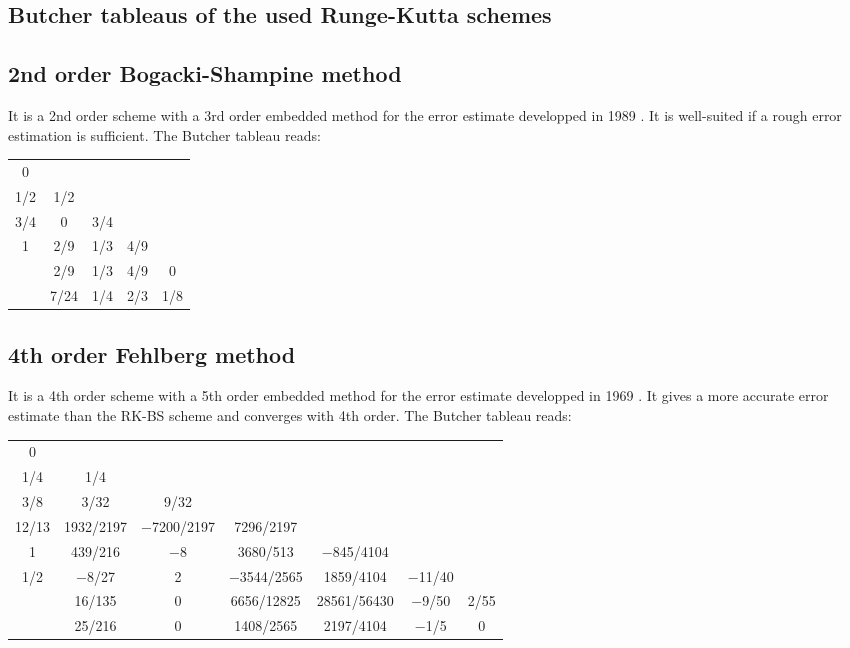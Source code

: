 \documentclass{report}
\begin{document}
\begin{appendices}
	
	\chapter{Butcher tableaus of the used Runge-Kutta schemes}
	\label{apx:ButcherTableaus}
	
	\section{2nd order Bogacki-Shampine method}
	It is a 2nd order scheme with a 3rd order embedded method for the error estimate developped in 1989 \cite{RK-BogackiShampine}. It is well-suited if a rough error estimation is sufficient. The Butcher tableau reads:
	\begin{center}
		\begin{tabular}{c | c c c c}
			0 & & & & \\
			1/2 & 1/2 & & & \\
			3/4 & 0 & 3/4 & & \\
			1 & 2/9 & 1/3 & 4/9 & \\ \hline
			& 2/9 & 1/3 & 4/9 & 0 \\
			& 7/24 & 1/4 & 2/3 & 1/8
		\end{tabular}
	\end{center}
	
	\section{4th order Fehlberg method}
	It is a 4th order scheme with a 5th order embedded method for the error estimate developped in 1969 \cite{RK-Fehlberg}. It gives a more accurate error estimate than the RK-BS scheme and converges with 4th order. The Butcher tableau reads:
	
	\begin{center}
		\begin{tabular}{c | c c c c c c}
			0 & & & & & & \\
			1/4 & 1/4 & & & & & \\
			3/8 & 3/32 & 9/32 & & & &\\
			12/13 & 1932/2197 &	−7200/2197 & 7296/2197 & & & \\
			1 & 439/216 & −8 & 3680/513 & −845/4104 & & \\
			1/2 & −8/27 & 2 & −3544/2565 & 1859/4104 & −11/40 	& \\ \hline
			& 16/135 & 0 & 6656/12825 & 28561/56430 & −9/50 & 2/55 \\ 
			& 25/216 & 0 & 1408/2565 & 2197/4104 & −1/5 & 0 
		\end{tabular}
	\end{center}
	

\end{appendices}
\end{document}
